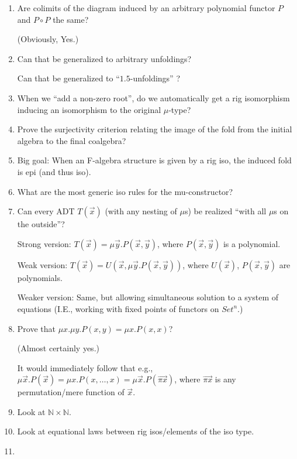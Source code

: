 \documentclass[letterpaper,numbers=enddot]{scrartcl}
\newcommand{\nat}{\mathbb{N}}
\begin{document}
\begin{enumerate}
  \item Are colimits of the diagram induced by an arbitrary polynomial functor $P$ and $P \circ P$ the same?

  (Obviously, Yes.)

  \item Can that be generalized to arbitrary unfoldings?

  Can that be generalized to ``$1.5$-unfoldings'' ?

  \item When we ``add a non-zero root'', do we automatically get a
  rig isomorphism inducing an isomorphism to the original $\mu$-type?

  \item Prove the surjectivity criterion relating the image of the fold
  from the initial algebra to the final coalgebra?

  \item Big goal: When an F-algebra structure is given by a rig iso,
  the induced fold is epi (and thus iso).

  \item What are the most generic iso rules for the mu-constructor?

  \item Can every ADT $T(\vec x)$ (with any nesting of $\mu$s) be realized
  ``with all $\mu$s on the outside''?

  Strong version:  $T(\vec x) = \mu \vec y. P(\vec x, \vec y)$, where $P(\vec x, \vec y)$ is a polynomial.

  Weak version:  $T(\vec x) = U(\vec x, \mu \vec y. P(\vec x, \vec y))$, where $U(\vec x)$,
  $P(\vec x, \vec y)$ are polynomials.

  Weaker version: Same, but allowing simultaneous solution to a system of equations
  (I.E., working with fixed points of functors on $Set^n$.)

  \item Prove that $\mu x. \mu y. P(x,y) = \mu x. P(x,x)$?

  (Almost certainly yes.)

  It would immediately follow that e.g.,
  $\mu \vec x. P(\vec x) = \mu x. P(x,\dots,x) = \mu \vec x. P(\vec{\pi x})$,
  where $\vec{\pi x}$ is any permutation/mere function
  of $\vec x$.

  \item Look at $\nat \times \nat$.

  \item Look at equational laws between rig isos/elements of the iso type.

  \item
\end{enumerate}
\end{document}
